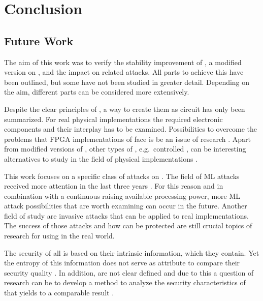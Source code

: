 \chapter{Conclusion}
\label{cap:conclusion}

\section{Future Work}

The aim of this work was to verify the stability improvement of \mpufs, a modified version on \apufs, and the impact on related attacks.
All parts to achieve this have been outlined, but some have not been studied in greater detail.
Depending on the aim, different parts can be considered more extensively.

Despite the clear principles of \apufs, a way to create them as circuit has only been summarized.
For real physical implementations the required electronic components and their interplay has to be examined.
Possibilities to overcome the problems that \ac{FPGA} implementations of \apufs face is be an issue of research \cite{Majzoobi2010FPGALines,Morozov2010AnFPGA,Machida2015AFPGA,Machida2015ImplementationFPGA}.
Apart from modified versions of \apufs, other types of \pufs, e.g.\ controlled \pufs, can be interesting alternatives to study in the field of physical implementations \cite{Gassend2007ControlledFunctions}.

This work focuses on a specific class of attacks on \pufs.
The field of \ac{ML} attacks received more attention in the last three years \cite{Google2017MachineTrends}.
For this reason and in combination with a continuous raising available processing power, more \ac{ML} attack possibilities that are worth examining can occur in the future.
Another field of study are invasive attacks that can be applied to real \puf implementations.
The success of those attacks and how \pufs can be protected are still crucial topics of research for using \pufs in the real world.

The security of all \pufs is based on their intrinsic information, which they contain.
Yet the entropy of this information does not serve as attribute to compare their security quality \cite{Ruhrmair2010ModelingFunctions}.
In addition, \pufs are not clear defined and due to this a question of research can be to develop a method to analyze the security characteristics of \pufs that yields to a comparable result \cite{Becker2015ThePUFs}.

